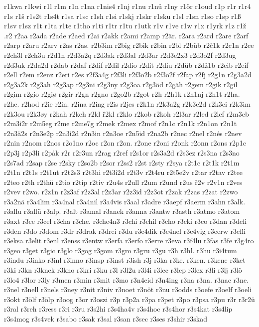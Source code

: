 {{r1kwa
r1kwi
r1l
r1m
r1n
r1na
r1nis4
r1nj
r1nu
r1nü
r1ny
r1ör
r1oud
r1p
r1r
r1r4
r1s
r1š
r1s2t
r1s4t
r1sa
r1sc
r1sh
r1si
r1skj
r1skr
r1sku
r1sl
r1sn
r1so
r1sp
r1ß
r1sv
r1sz
r1t
r1ta
r1te
r1tho
r1ti
r1tr
r1tu
r1utk
r1v
r1ve
r1w
r1x
r1yrk
r1z
r1ž
.r2
r2aa
r2ada
r2ade
r2aed
r2ai
r2akk
r2ami
r2amp
r2är.
r2ara
r2ard
r2are
r2arf
r2arp
r2aru
r2arv
r2as
r2as.
r2b3im
r2big
r2bik
r2bin
r2bl
r2büb
r2č1k
r2c1n
r2ce
r2ch3l
r2ch3u
r2d1n
r2d3a2q
r2d3ak
r2d3al
r2d3ar
r2d3e2x3
r2d3o2f
r2d3ug
r2d3uk
r2da2d
r2dab
r2daf
r2dif
r2dil
r2dio
r2dit
r2diu
r2düb
r2dž1b
r2eib
r2eif
r2ell
r2em
r2enz
r2eri
r2es
r2f3a4g
r2f3li
r2f3o2b
r2f3o2f
r2fap
r2fj
r2g1n
r2g3a2d
r2g3a2k
r2g3ah
r2g3ap
r2g3ni
r2g3ny
r2g3oa
r2g3öd
r2gäh
r2gem
r2gik
r2gil
r2gim
r2gio
r2giø
r2gir
r2gn
r2gno
r2go2b
r2got
r2h
r2h1k
r2h1nj
r2h1t
r2ha.
r2he.
r2hod
r2ie
r2in.
r2ina
r2ing
r2is
r2jes
r2k1n
r2k3a2g
r2k3e2d
r2k3ei
r2k3im
r2k3ou
r2k3øy
r2kah
r2keh
r2kl
ř2kl
r2klo
r2kob
r2koh
r2l3ar
r2led
r2lef
r2m3eb
r2m3i2r
r2m5eg
r2me
r2me7g
r2mek
r2mex
r2mof
r2n1c
r2n1k
r2n1on
r2n1t
r2n3ä2s
r2n3e2p
r2n3i2d
r2n3in
r2n3oe
r2n5id
r2na2b
r2nec
r2nel
r2nés
r2nev
r2nin
r2nom
r2nos
r2o1no
r2oc
r2on
r2on.
r2one
r2oni
r2onk
r2onn
r2ons
r2p1c
r2p3j
r2p3li
r2påk
r2r
r2r3un
r2rag
r2ref
r2s1or
r2s3a2d
r2s3ez
r2s3na
r2s3no
r2s7ad
r2sap
r2se
r2sky
r2so2b
r2sor
r2ss2
r2st
r2sty
r2sya
r2t1c
r2t1k
r2t1m
r2t1n
r2t1s
r2t1ut
r2t2s3
r2t3hi
r2t3i2d
r2t3v
r2t4ru
r2t5e2v
r2tar
r2tav
r2tee
r2teo
r2th
r2thü
r2tio
r2tip
r2tiv
r2u4s
r2ull
r2um
r2und
r2us
ř2v
r2v1n
r2ves
r2vev
r2wo.
r2z1n
r2z3af
r2z3al
r2z3ar
r2z3id
r2z3ot
r2zak
r2zas
r2zat
r2zwo
r3a2nä
r3a4lim
r3a4nal
r3a4nil
r3a4vis
r3aal
r3adre
r3aepf
r3aerm
r3ahn
r3alk.
r3allu
r3allü
r3alp.
r3alt
r3amal
r3anek
r3anna
r3antw
r3asth
r3atmo
r3atom
r3axt
r3ce
r3cel
r3cha
r3che.
r3che4n3
r3chi
r3chil
r3cho
r3cki
r3co
r3dan
r3defi
r3den
r3do
r3dom
r3dr
r3drak
r3drei
r3du
r3e4dik
r3e4nel
r3e4vig
r3eerw
r3effi
r3eksa
r3elit
r3enl
r3enss
r3entw
r3erfa
r3erfo
r3erre
r3eva
r3f4lu
r3fas
r3fe
r3g4ro
r3geo
r3get
r3gic
r3glo
r3gog
r3gom
r3gro
r3gru
r3gu
r3h
r3hl.
r3hu
r3i4tum
r3indu
r3inko
r3inl
r3inno
r3insp
r3inst
r3ish
r3j
r3ka
r3ke.
r3ken.
r3kene
r3ket
r3ki
r3kn
r3knek
r3kno
r3kri
r3ku
r3l
r3l2u
r3l4i
r3lec
r3lep
r3lex
r3li
r3lj
r3lö
r3lo4
r3lor
r3ly
r3men
r3min
r3mit
r3mo
r3n4eid
r3n4ing
r3na
r3na.
r3nac
r3ne.
r3nel
r3nell
r3nels
r3ney
r3nit
r3niv
r3noet
r3nöt
r3nu
r3odds
r3oefe
r3oelf
r3oeli
r3okt
r3ölf
r3ölp
r3oog
r3or
r3oszi
r3p
r3p2a
r3pa
r3pet
r3po
r3psa
r3pu
r3r
r3r2ü
r3ral
r3reh
r3ress
r3ri
r3ru
r3s2hi
r3s4ha4v
r3s4hoc
r3s4hor
r3s4kat
r3s4lip
r3s4mog
r3s4vek
r3sabo
r3sak
r3sal
r3san
r3sec
r3ses
r3shir
r3skad
}}
